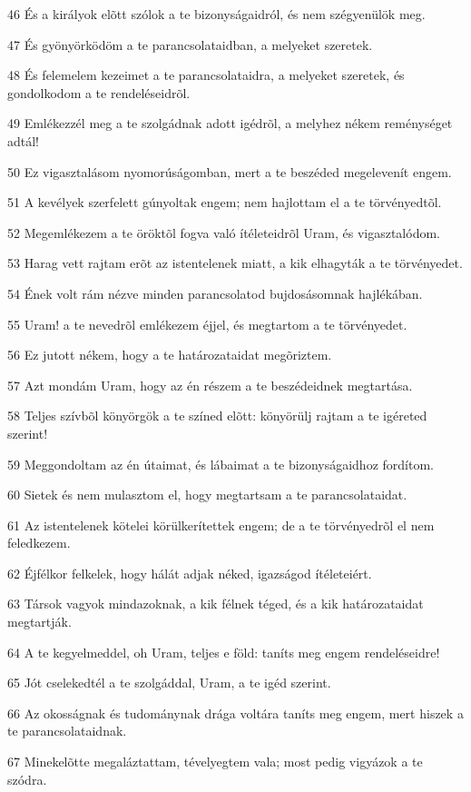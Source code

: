 \par 46 És a királyok elõtt szólok a te bizonyságaidról, és nem szégyenülök meg.
\par 47 És gyönyörködöm a te parancsolataidban, a melyeket szeretek.
\par 48 És felemelem kezeimet a te parancsolataidra, a melyeket szeretek, és gondolkodom a te rendeléseidrõl.
\par 49 Emlékezzél meg a te szolgádnak adott igédrõl, a melyhez nékem reménységet adtál!
\par 50 Ez vigasztalásom nyomorúságomban, mert a te beszéded megelevenít engem.
\par 51 A kevélyek szerfelett gúnyoltak engem; nem hajlottam el a te törvényedtõl.
\par 52 Megemlékezem a te öröktõl fogva való ítéleteidrõl Uram, és vigasztalódom.
\par 53 Harag vett rajtam erõt az istentelenek miatt, a kik elhagyták a te törvényedet.
\par 54 Ének volt rám nézve minden parancsolatod bujdosásomnak hajlékában.
\par 55 Uram! a te nevedrõl emlékezem éjjel, és megtartom a te törvényedet.
\par 56 Ez jutott nékem, hogy a te határozataidat megõriztem.
\par 57 Azt mondám Uram, hogy az én részem a te beszédeidnek megtartása.
\par 58 Teljes szívbõl könyörgök a te színed elõtt: könyörülj rajtam a te igéreted szerint!
\par 59 Meggondoltam az én útaimat, és lábaimat a te bizonyságaidhoz fordítom.
\par 60 Sietek és nem mulasztom el, hogy megtartsam a te parancsolataidat.
\par 61 Az istentelenek kötelei körülkerítettek engem; de a te törvényedrõl el nem feledkezem.
\par 62 Éjfélkor felkelek, hogy hálát adjak néked, igazságod ítéleteiért.
\par 63 Társok vagyok mindazoknak, a kik félnek téged, és a kik határozataidat megtartják.
\par 64 A te kegyelmeddel, oh Uram, teljes e föld: taníts meg engem rendeléseidre!
\par 65 Jót cselekedtél a te szolgáddal, Uram, a te igéd szerint.
\par 66 Az okosságnak és tudománynak drága voltára taníts meg engem, mert hiszek a te parancsolataidnak.
\par 67 Minekelõtte megaláztattam, tévelyegtem vala; most pedig vigyázok a te szódra.
